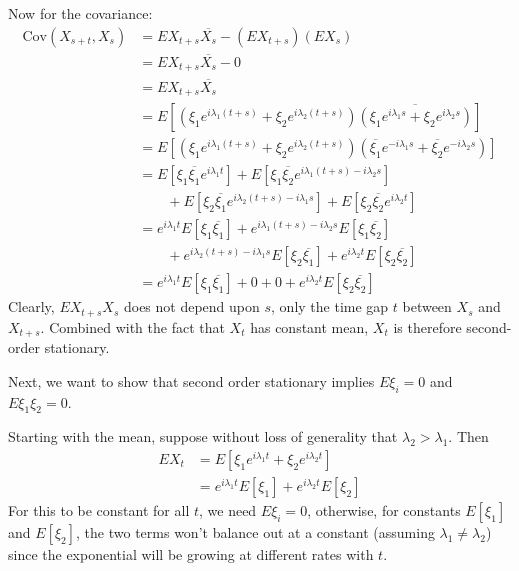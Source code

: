 \documentclass[12pt]{article}
\theoremstyle{plain}
\theoremstyle{definition}
\theoremstyle{remark}
\begin{document}
\begin{enumerate}
\begin{enumerate}
        Now for the covariance:
        \begin{align*}
          \text{Cov}(X_{s+t},X_s) &= EX_{t+s}\overline{X_s} -(EX_{t+s})(EX_s) \\
          &=  EX_{t+s}\overline{X_s}-0 \\
          &= EX_{t+s}\overline{X_s}\\
          &= E[( \xi_1 e^{i\lambda_1 (t+s)} + \xi_2e^{i\lambda_2 (t+s)})
            \overline{( \xi_1 e^{i\lambda_1 s} + \xi_2e^{i\lambda_2 s})}]\\
          &= E[ (\xi_1 e^{i\lambda_1 (t+s)} + \xi_2e^{i\lambda_2 (t+s)})
            ( \overline{\xi_1} e^{-i\lambda_1 s} + \overline{\xi_2}e^{-i\lambda_2 s})]\\
          &= E[ \xi_1\overline{\xi_1} e^{i\lambda_1 t}]
             + E[ \xi_1\overline{\xi_2} e^{i\lambda_1 (t+s)-i\lambda_2 s}]\\
          &\qquad
             + E[ \xi_2\overline{\xi_1} e^{i\lambda_2 (t+s)-i\lambda_1 s}]
            + E[ \xi_2\overline{\xi_2} e^{i\lambda_2 t}] \\
          &= e^{i\lambda_1 t}E[ \xi_1\overline{\xi_1} ]
             + e^{i\lambda_1 (t+s)-i\lambda_2 s}E[ \xi_1\overline{\xi_2} ]\\
          &\qquad
             + e^{i\lambda_2 (t+s)-i\lambda_1 s}E[ \xi_2\overline{\xi_1}]
            + e^{i\lambda_2 t}E[ \xi_2\overline{\xi_2} ] \\
          &= e^{i\lambda_1 t}E[ \xi_1\overline{\xi_1} ]
             +0 +0
            + e^{i\lambda_2 t}E[ \xi_2\overline{\xi_2} ]
        \end{align*}
        Clearly, $EX_{t+s}X_s$ does not depend upon $s$, only the time
        gap $t$ between $X_{s}$ and $X_{t+s}$.  Combined with the fact
        that $X_t$ has constant mean, $X_t$ is therefore second-order
        stationary.

        Next, we want to show that second order stationary implies
        $E\xi_i=0$ and $E\xi_1\xi_2=0$.

        Starting with the mean, suppose without loss of generality that
        $\lambda_2 >\lambda_1$. Then
        \begin{align*}
          EX_t &= E[ \xi_1 e^{i\lambda_1 t} + \xi_2e^{i\lambda_2 t}] \\
          &=  e^{i\lambda_1 t}E[ \xi_1] + e^{i\lambda_2 t}E[\xi_2]
        \end{align*}
        For this to be constant for all $t$, we need $E\xi_i=0$,
        otherwise, for constants $E[\xi_1]$ and $E[\xi_2]$, the two
        terms won't balance out at a constant (assuming $\lambda_1\neq
        \lambda_2$) since the exponential will be growing at different
        rates with $t$.


\end{enumerate}
\end{enumerate}
\end{document}
